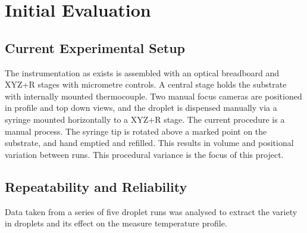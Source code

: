\chapter{Initial Evaluation}\label{C:init_eval}


\section{Current Experimental Setup}
The instrumentation as exists is assembled with an optical breadboard and XYZ+R stages with micrometre controls. A central stage holds the substrate with internally mounted thermocouple. Two manual focus cameras are positioned in profile and top down views, and the droplet is dispensed manually via a syringe mounted horizontally to a XYZ+R stage.
The current procedure is a manual process. The syringe tip is rotated above a marked point on the substrate, and hand emptied and refilled. This results in volume and positional variation between runs. This procedural variance is the focus of this project.

\section{Repeatability and Reliability}

Data taken from a series of five droplet runs was analysed to extract the variety in droplets and its effect on the measure temperature profile. 

